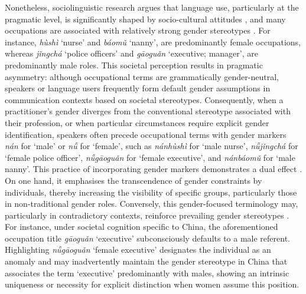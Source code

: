 \documentclass[11pt]{article}
\newcommand{\zh}[1]{\simplifiedchinesefont{#1}\rmfamily}
\begin{document}
Nonetheless, sociolinguistic research argues that language use, particularly at the pragmatic level, is significantly shaped by socio-cultural attitudes \citep{labov_1972_sociolinguistic}, and many occupations are associated with relatively strong gender stereotypes \citep{sun_1997_language,su_2021_occupational}. For instance, \zh{护士} \textit{hùshì} `nurse' and \zh{保姆} \textit{báomǔ} `nanny', are predominantly female occupations, whereas \zh{警察} \textit{jǐngchá} `police officers' and \zh{高管} \textit{gāoguǎn} `executive; manager', are predominantly male roles. This societal perception results in pragmatic asymmetry: although occupational terms are grammatically gender-neutral, speakers or language users frequently form default gender assumptions in communication contexts based on societal stereotypes. Consequently, when a practitioner's gender diverges from the conventional stereotype associated with their profession, or when particular circumstances require explicit gender identification, speakers often precede occupational terms with gender markers \zh{男} \textit{nán} for `male' or \zh{女} \textit{nǚ} for `female', such as \zh{男护士} \textit{nánhùshì} for `male nurse', \zh{女警察} \textit{nǚjǐngchá} for `female police officer', \zh{女高管} \textit{nǚgāoguǎn} for `female executive', and \zh{男保姆} \textit{nánbáomǔ} for `male nanny'. This practice of incorporating gender markers demonstrates a dual effect \citep{sun_1997_language,gustafssonsenden_2015_introducing,su_2021_occupational}. On one hand, it emphasises the transcendence of gender constraints by individuals, thereby increasing the visibility of specific groups, particularly those in non-traditional gender roles. Conversely, this gender-focused terminology may, particularly in contradictory contexts, reinforce prevailing gender stereotypes \citep{sun_1997_language,gustafssonsenden_2015_introducing}. For instance, under societal cognition specific to China, the aforementioned occupation title \zh{高管} \textit{gāoguǎn} `executive' subconsciously defaults to a male referent. Highlighting \zh{女高管} \textit{nǚgāoguǎn} `female executive' designates the individual as an anomaly and may inadvertently maintain the gender stereotype in China that associates the term `executive' predominantly with males, showing an intrinsic uniqueness or necessity for explicit distinction when women assume this position.
\end{document}
